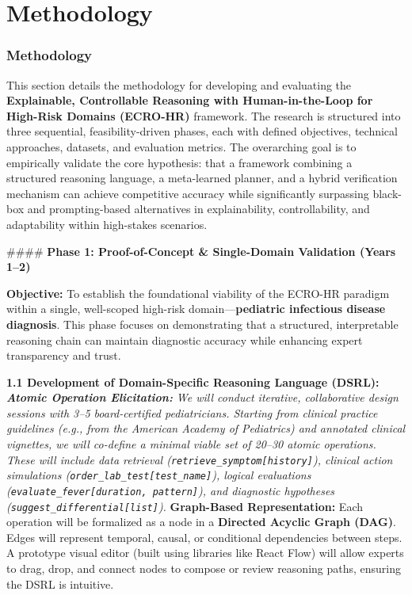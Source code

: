 \documentclass[11pt,a4paper]{article}
\begin{document}
\section{Methodology}

\subsubsection{\textbf{Methodology}}

This section details the methodology for developing and evaluating the \textbf{Explainable, Controllable Reasoning with Human-in-the-Loop for High-Risk Domains (ECRO-HR)} framework. The research is structured into three sequential, feasibility-driven phases, each with defined objectives, technical approaches, datasets, and evaluation metrics. The overarching goal is to empirically validate the core hypothesis: that a framework combining a structured reasoning language, a meta-learned planner, and a hybrid verification mechanism can achieve competitive accuracy while significantly surpassing black-box and prompting-based alternatives in explainability, controllability, and adaptability within high-stakes scenarios.

#### \textbf{Phase 1: Proof-of-Concept & Single-Domain Validation (Years 1–2)}

\textbf{Objective:} To establish the foundational viability of the ECRO-HR paradigm within a single, well-scoped high-risk domain—\textbf{pediatric infectious disease diagnosis}. This phase focuses on demonstrating that a structured, interpretable reasoning chain can maintain diagnostic accuracy while enhancing expert transparency and trust.

\textbf{1.1 Development of Domain-Specific Reasoning Language (DSRL):}
\textit{   \textbf{Atomic Operation Elicitation:} We will conduct iterative, collaborative design sessions with 3–5 board-certified pediatricians. Starting from clinical practice guidelines (e.g., from the American Academy of Pediatrics) and annotated clinical vignettes, we will co-define a minimal viable set of 20–30 atomic operations. These will include data retrieval (\texttt{retrieve_symptom[history]}), clinical action simulations (\texttt{order_lab_test[test_name]}), logical evaluations (\texttt{evaluate_fever[duration, pattern]}), and diagnostic hypotheses (\texttt{suggest_differential[list]}).
}   \textbf{Graph-Based Representation:} Each operation will be formalized as a node in a \textbf{Directed Acyclic Graph (DAG)}. Edges will represent temporal, causal, or conditional dependencies between steps. A prototype visual editor (built using libraries like React Flow) will allow experts to drag, drop, and connect nodes to compose or review reasoning paths, ensuring the DSRL is intuitive.
\end{document}
